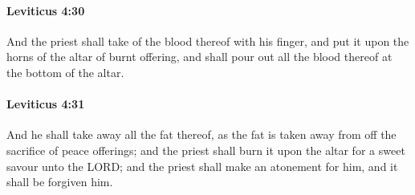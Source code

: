 		\paragraph{Leviticus 4:30} %
			\label{LEVITICUS-4-30}

			And the priest shall take of the blood thereof with his finger, and put it upon the horns of the altar of burnt offering, and shall pour out all the blood thereof at the bottom of the altar.


		\paragraph{Leviticus 4:31} %
			\label{LEVITICUS-4-31}

			And he shall take away all the fat thereof, as the fat is taken away from off the sacrifice of peace offerings; and the priest shall burn it upon the altar for a sweet savour unto the LORD; and the priest shall make an atonement for him, and it shall be forgiven him.


